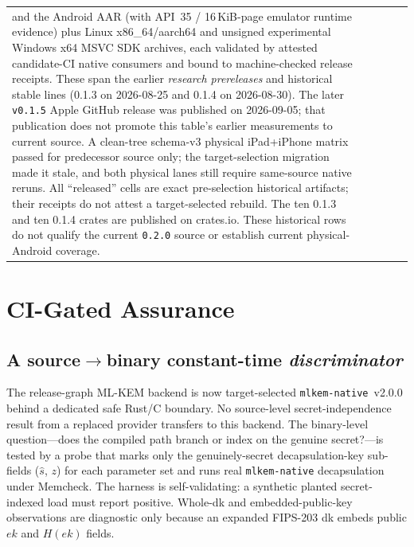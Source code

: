 \documentclass[journal]{IEEEtran}
\newcommand{\code}[1]{\texttt{\small #1}}
\begin{document}
\begin{table}[t]
\begin{tabular}{@{}l l c c c@{}}
{and the Android AAR (with API~35 / 16\,KiB-page emulator runtime evidence) plus Linux
x86\_64/aarch64 and unsigned experimental Windows x64 MSVC SDK archives, each validated by
attested candidate-CI native consumers and bound to machine-checked release receipts. These
span the earlier \emph{research prereleases} and historical stable lines
(0.1.3 on 2026-08-25 and 0.1.4 on 2026-08-30).
The later \code{v0.1.5} Apple GitHub release was published on 2026-09-05; that
publication does not promote this table's earlier measurements to current source.
A clean-tree schema-v3 physical iPad+iPhone matrix passed for predecessor source only; the
target-selection migration made it stale, and both physical lanes still require
same-source native reruns. All ``released'' cells are exact pre-selection historical
artifacts; their receipts do not attest a target-selected rebuild. The ten 0.1.3 and ten
0.1.4 crates are published on crates.io. These historical rows do not qualify the
current \code{0.2.0} source or establish current physical-Android coverage.}\\
\end{tabular}
\end{table}

\section{CI-Gated Assurance}\label{sec:assurance}
\subsection{A source\texorpdfstring{$\to$}{-to-}binary constant-time \emph{discriminator}}
The release-graph ML-KEM backend is now target-selected \code{mlkem-native}~v2.0.0 behind a
dedicated safe Rust/C boundary. No source-level secret-independence result from a replaced
provider transfers to this backend.
The binary-level question---does the compiled path branch or index on the genuine secret?---is
tested by a probe that marks only the genuinely-secret decapsulation-key sub-fields
($\hat s$, $z$) for each parameter set and runs real \code{mlkem-native} decapsulation under Memcheck. The harness is
self-validating: a synthetic planted secret-indexed load must report positive. Whole-dk and
embedded-public-key observations are diagnostic only because an expanded FIPS-203 dk embeds public
$ek$ and $H(ek)$ fields.
\end{document}
